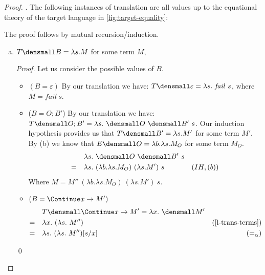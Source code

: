 


\begin{proof}
    .
    The following instances of translation are all values up to the equational theory of the target language in \cref{fig:target-equality}:

    The proof follows by mutual recursion/induction.
    \begin{enumerate}[(a)]
        \item $T\den{B} = \lambda s. M$ for some term $M$,
        \begin{proof}
            Let us consider the possible values of $B$.
            \begin{itemize}
                \item $(B = \varepsilon)$ By our translation we have: $T\den{\varepsilon} = \lambda s. ~\mathit{fail} ~s$, where $M=\mathit{fail} ~s$.
                \item ($B = O; B'$) By our translation we have: $T\den{O; B'} = \lambda s. ~\den{O} ~\den{B'} ~s$.
                    Our induction hypothesis provides us that $T\den{B'} = \lambda s. M'$ for some term $M'$.
                    By (b) we know that $E\den{O}=\lambda b. \lambda s. M_O$ for some term $M_O$.
                    \begin{align*}
                        & \quad \lambda s. ~\den{O} ~\den{B'} ~s \\
                        =& \quad \lambda s.  ~(\lambda b. \lambda s. M_O) ~(\lambda s. M') ~s & (IH, (b))
                    \end{align*}
                    Where $M=M'' ~(\lambda b. \lambda s. M_O) ~(\lambda s. M') ~s$.
                    \item $(B = \Continue x \to M')$ 
                    \begin{align*}
                        & \quad T\den{\Continue x \to M'} = \lambda x. ~\den{M}' \\
                        =& \quad \lambda x. ~(\lambda s. ~M'') & (\cref{l-trans-terms}) \\
                        =& \quad \lambda s. ~(\lambda s. ~M'') \subst{x}{s} & (=_{\alpha})
                    \end{align*} 
            \end{itemize}
            \qed
        \end{proof}

\end{enumerate}
\end{proof}
